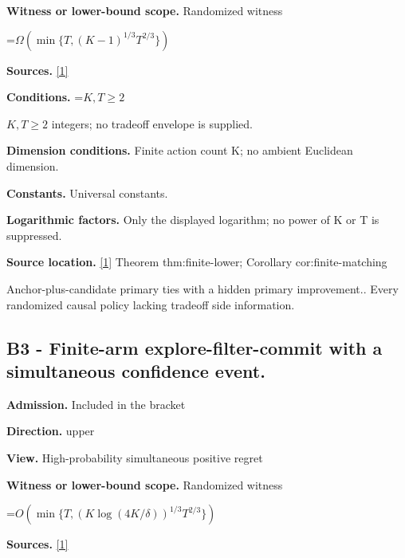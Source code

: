 \documentclass[10pt,a4paper]{article}
\newcommand{\AtlasMath}[1]{\par\begingroup\centering\setbox0=\hbox{$\displaystyle #1$}\ifdim\wd0>1.4\linewidth\typeout{ATLAS WIDE FORMULA: \the\wd0}\fi\ifdim\wd0>\linewidth\resizebox{\linewidth}{!}{\box0}\else\box0\fi\par\endgroup}
\newcommand{\AtlasInlineMath}[1]{\begingroup\setbox0=\hbox{$#1$}\ifdim\wd0>.4\linewidth\endgroup\AtlasMath{#1}\else\endgroup$#1$\fi}
\begin{document}
\textbf{Witness or lower-bound scope.} Randomized witness



\AtlasMath{\Omega\!\left(\min\{T,(K-1)^{1/3}T^{2/3}\}\right)}


\textbf{Sources.} \href{https://github.com/WU-Wendao/Colombo/blob/main/colombo_sensorium/Complexity_altas/data/sources/colombo/U07/manuscript.pdf}{[1]}



\textbf{Conditions.} \AtlasInlineMath{K,T\ge2} integers; no tradeoff envelope is supplied.



\textbf{Dimension conditions.} Finite action count K; no ambient Euclidean dimension.



\textbf{Constants.} Universal constants.



\textbf{Logarithmic factors.} Only the displayed logarithm; no power of K or T is suppressed.



\textbf{Source location.} \href{https://github.com/WU-Wendao/Colombo/blob/main/colombo_sensorium/Complexity_altas/data/sources/colombo/U07/manuscript.pdf}{[1]} Theorem thm:finite-lower; Corollary cor:finite-matching



Anchor-plus-candidate primary ties with a hidden primary improvement.. Every randomized causal policy lacking tradeoff side information.



\subsection{B3 - Finite-arm explore-filter-commit with a simultaneous confidence event.}


\textbf{Admission.} Included in the bracket



\textbf{Direction.} upper



\textbf{View.} High-probability simultaneous positive regret



\textbf{Witness or lower-bound scope.} Randomized witness



\AtlasMath{O\!\left(\min\{T,(K\log(4K/\delta))^{1/3}T^{2/3}\}\right)}


\textbf{Sources.} \href{https://github.com/WU-Wendao/Colombo/blob/main/colombo_sensorium/Complexity_altas/data/sources/colombo/U07/manuscript.pdf}{[1]}
\end{document}
